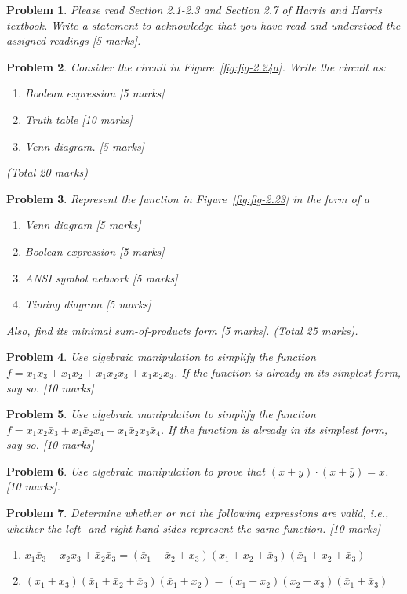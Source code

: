 \documentclass{article}
\newtheorem{prob}{Problem}
\newcommand{\bx}{\bar{x}}
\begin{document}
\begin{prob}
  Please read Section 2.1-2.3 and Section 2.7 of Harris and Harris textbook. Write a statement to acknowledge that you have read and understood the assigned readings [5 marks].
\end{prob}

\begin{prob}
  Consider the circuit in Figure~\ref{fig:fig-2.24a}. Write the circuit as:
  \begin{enumerate}
    \item Boolean expression [5 marks]
    \item Truth table [10 marks]
    \item Venn diagram. [5 marks]
  \end{enumerate} (Total 20 marks)
\end{prob}

\begin{prob}
Represent the function in Figure~\ref{fig:fig-2.23} in the form of a 
\begin{enumerate}
  \item Venn diagram [5 marks]
  \item Boolean expression [5 marks]
  \item ANSI symbol network [5 marks]
  \item \st{Timing diagram [5 marks]}
\end{enumerate}
    Also, find its minimal sum-of-products form [5 marks].
    (Total 25 marks).
\end{prob}

\begin{prob}
Use algebraic manipulation to simplify the function $f = x_1x_3 + x_1x_2 + \bx_1 \bx_2 x_3 + \bx_1 \bx_2 \bx_3$. If the function is already in its simplest form, say so. [10 marks]
\end{prob}

\begin{prob}
Use algebraic manipulation to simplify the function $f = x_1 x_2\bx_3 + x_1\bx_2x_4 + x_1\bx_2 x_3\bx_4$. If the function is already in its simplest form, say so. [10 marks]
\end{prob}

\begin{prob}
Use algebraic manipulation to prove that $(x+y)\cdot(x+\bar{y}) = x$. [10 marks].
\end{prob}

\begin{prob}
Determine whether or not the following expressions are valid, i.e., whether the
left- and right-hand sides represent the same function.
[10 marks]
\begin{enumerate}
    \item $x_1 \bx_3 + x_2 x_3 + \bx_2 \bx_3 = (\bx_1 + \bx_2 + x_3)(x_1 + x_2 + \bx_3)(\bx_1 + x_2 + \bx_3)$
    \item $(x_1 + x_3)(\bx_1 + \bx_2 + \bx_3)(\bx_1 + x_2) = (x_1 + x_2)(x_2 + x_3)(\bx_1 + \bx_3)$
\end{enumerate}
\end{prob}
\end{document}
